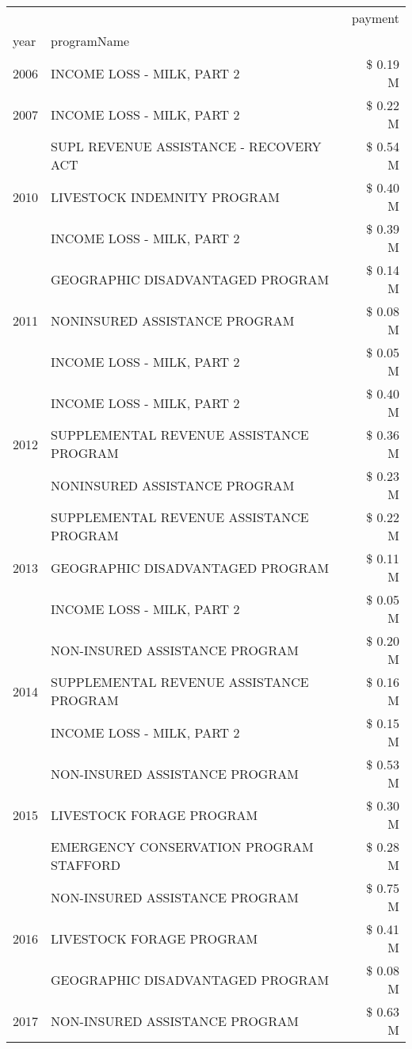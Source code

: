 \begin{tabular}{llr}
\toprule
 &  & payment \\
year & programName &  \\
\midrule
2006 & INCOME LOSS - MILK, PART 2 & \$ 0.19 M \\
\cline{1-3}
2007 & INCOME LOSS - MILK, PART 2 & \$ 0.22 M \\
\cline{1-3}
\multirow[t]{3}{*}{2010} & SUPL REVENUE ASSISTANCE - RECOVERY ACT & \$ 0.54 M \\
 & LIVESTOCK INDEMNITY PROGRAM & \$ 0.40 M \\
 & INCOME LOSS - MILK, PART 2 & \$ 0.39 M \\
\cline{1-3}
\multirow[t]{3}{*}{2011} & GEOGRAPHIC DISADVANTAGED PROGRAM & \$ 0.14 M \\
 & NONINSURED ASSISTANCE PROGRAM & \$ 0.08 M \\
 & INCOME LOSS - MILK, PART 2 & \$ 0.05 M \\
\cline{1-3}
\multirow[t]{3}{*}{2012} & INCOME LOSS - MILK, PART 2 & \$ 0.40 M \\
 & SUPPLEMENTAL REVENUE ASSISTANCE PROGRAM & \$ 0.36 M \\
 & NONINSURED ASSISTANCE PROGRAM & \$ 0.23 M \\
\cline{1-3}
\multirow[t]{3}{*}{2013} & SUPPLEMENTAL REVENUE ASSISTANCE PROGRAM & \$ 0.22 M \\
 & GEOGRAPHIC DISADVANTAGED PROGRAM & \$ 0.11 M \\
 & INCOME LOSS - MILK, PART 2 & \$ 0.05 M \\
\cline{1-3}
\multirow[t]{3}{*}{2014} & NON-INSURED ASSISTANCE PROGRAM & \$ 0.20 M \\
 & SUPPLEMENTAL REVENUE ASSISTANCE PROGRAM & \$ 0.16 M \\
 & INCOME LOSS - MILK, PART 2 & \$ 0.15 M \\
\cline{1-3}
\multirow[t]{3}{*}{2015} & NON-INSURED ASSISTANCE PROGRAM & \$ 0.53 M \\
 & LIVESTOCK FORAGE PROGRAM & \$ 0.30 M \\
 & EMERGENCY CONSERVATION PROGRAM STAFFORD & \$ 0.28 M \\
\cline{1-3}
\multirow[t]{3}{*}{2016} & NON-INSURED ASSISTANCE PROGRAM & \$ 0.75 M \\
 & LIVESTOCK FORAGE PROGRAM & \$ 0.41 M \\
 & GEOGRAPHIC DISADVANTAGED PROGRAM & \$ 0.08 M \\
\cline{1-3}
\multirow[t]{3}{*}{2017} & NON-INSURED ASSISTANCE PROGRAM & \$ 0.63 M \\

\end{tabular}
